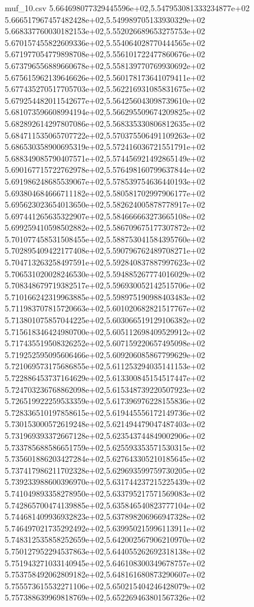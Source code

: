 \begin{filecontents*}{muf_10.csv}
5.664698077329445596e+02,5.547953081333234877e+02
5.666517967457482428e+02,5.549989705133930329e+02
5.668337760030182153e+02,5.552026689653275753e+02
5.670157455822609336e+02,5.554064028770444565e+02
5.671977054779898708e+02,5.556101722477860676e+02
5.673796556889660678e+02,5.558139770769930692e+02
5.675615962139646626e+02,5.560178173641079411e+02
5.677435270517705703e+02,5.562216931085831675e+02
5.679254482011542677e+02,5.564256043098739610e+02
5.681073596608994194e+02,5.566295509674209825e+02
5.682892614297807086e+02,5.568335330806812635e+02
5.684711535065707722e+02,5.570375506491109263e+02
5.686530358900695319e+02,5.572416036721551791e+02
5.688349085790407571e+02,5.574456921492865149e+02
5.690167715722762978e+02,5.576498160799637844e+02
5.691986248685539067e+02,5.578539754636440193e+02
5.693804684666711182e+02,5.580581702997906177e+02
5.695623023654013650e+02,5.582624005878778917e+02
5.697441265635322907e+02,5.584666663273665108e+02
5.699259410598502882e+02,5.586709675177307872e+02
5.701077458531508455e+02,5.588753041584395760e+02
5.702895409422177408e+02,5.590796762489708271e+02
5.704713263258497591e+02,5.592840837887997623e+02
5.706531020028246530e+02,5.594885267774016029e+02
5.708348679719382517e+02,5.596930052142515706e+02
5.710166242319963885e+02,5.598975190988403483e+02
5.711983707815720663e+02,5.601020682821517767e+02
5.713801075857044225e+02,5.603066519129106382e+02
5.715618346424980700e+02,5.605112698409529912e+02
5.717435519508326252e+02,5.607159220657495098e+02
5.719252595095606466e+02,5.609206085867799629e+02
5.721069573175686855e+02,5.611253294035141153e+02
5.722886453737164629e+02,5.613300845154517447e+02
5.724703236768862098e+02,5.615348739220507923e+02
5.726519922259533359e+02,5.617396976228155836e+02
5.728336510197858615e+02,5.619445556172149736e+02
5.730153000572619248e+02,5.621494479047487403e+02
5.731969393372667128e+02,5.623543744849002906e+02
5.733785688586651759e+02,5.625593353571530315e+02
5.735601886203427284e+02,5.627643305210185645e+02
5.737417986211702328e+02,5.629693599759730205e+02
5.739233988600396970e+02,5.631744237215225439e+02
5.741049893358278950e+02,5.633795217571569083e+02
5.742865700474139885e+02,5.635846540823777104e+02
5.744681409936932823e+02,5.637898206966947328e+02
5.746497021735292492e+02,5.639950215996113911e+02
5.748312535858252659e+02,5.642002567906210970e+02
5.750127952294537863e+02,5.644055262692318138e+02
5.751943271033140945e+02,5.646108300349678757e+02
5.753758492062809182e+02,5.648161680873290607e+02
5.755573615532271106e+02,5.650215404246428079e+02
5.757388639969818769e+02,5.652269463801567326e+02

\end{filecontents*}
